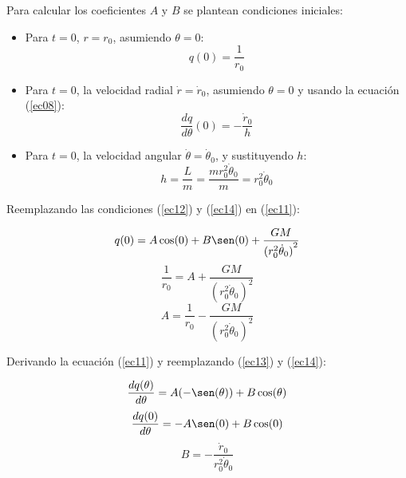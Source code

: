 \documentclass[letter,11pt]{article}
\begin{document}
Para calcular los coeficientes $A$ y $B$ se plantean condiciones iniciales:

\begin{itemize}
\item Para $t=0$, $r=r_0$, asumiendo $\theta=0$:
    \begin{equation}
        q(0)=\frac{1}{r_0}
        \label{ec12}
    \end{equation}
\item Para $t=0$, la velocidad radial $\dot{r}=\dot{r}_0$, asumiendo $\theta=0$
y usando la ecuación (\ref{ec08}):
    \begin{equation}
        \frac{dq}{d\theta}(0)=-\frac{\dot{r}_0}{h}
        \label{ec13}
    \end{equation}
\item Para $t=0$, la velocidad angular $\dot{\theta}=\dot{\theta}_0$, y
sustituyendo $h$:
    \begin{equation}
        h=\frac{L}{m}=\frac{mr^2_0\dot{\theta}_0}{m}=r^2_0\dot{\theta}_0
        \label{ec14}
    \end{equation}
\end{itemize}

Reemplazando las condiciones (\ref{ec12}) y (\ref{ec14}) en (\ref{ec11}):

\begin{equation*}
    q(0)=A\cos(0)+B\sen(0)+\frac{GM}{{(r^2_0\dot{\theta}_0)}^2}
\end{equation*}
\begin{equation*}
    \frac{1}{r_0}=A+\frac{GM}{{(r^2_0\dot{\theta}_0)}^2}
\end{equation*}
\begin{equation}
    A=\frac{1}{r_0}-\frac{GM}{{(r^2_0\dot{\theta}_0)}^2}
    \label{ec15}
\end{equation}

Derivando la ecuación (\ref{ec11}) y reemplazando (\ref{ec13}) y (\ref{ec14}):

\begin{equation*}
    \frac{dq(\theta)}{d\theta}=A(-\sen(\theta))+B\cos(\theta)
\end{equation*}
\begin{equation*}
    \frac{dq(0)}{d\theta}=-A\sen(0)+B\cos(0)
\end{equation*}
\begin{equation}
    B=-\frac{\dot{r}_0}{r^2_0\dot{\theta}_0}
    \label{ec16}
\end{equation}
\\
\end{document}
